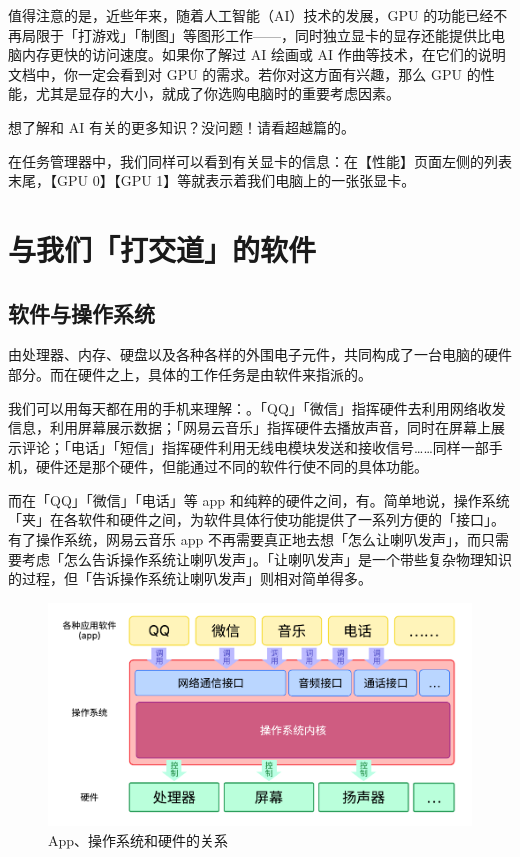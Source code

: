 值得注意的是，近些年来，随着人工智能（AI）技术的发展，GPU 的功能已经不再局限于「打游戏」「制图」等图形工作——，同时独立显卡的显存还能提供比电脑内存更快的访问速度。如果你了解过 AI 绘画或 AI 作曲等技术，在它们的说明文档中，你一定会看到对 GPU 的需求。若你对这方面有兴趣，那么 GPU 的性能，尤其是显存的大小，就成了你选购电脑时的重要考虑因素。

\begin{note}
  想了解和 AI 有关的更多知识？没问题！请看超越篇的。
\end{note}

在任务管理器中，我们同样可以看到有关显卡的信息：在【性能】页面左侧的列表末尾，【GPU 0】【GPU 1】等就表示着我们电脑上的一张张显卡。

\section{与我们「打交道」的软件}

\subsection{软件与操作系统}

由处理器、内存、硬盘以及各种各样的外围电子元件，共同构成了一台电脑的硬件部分。而在硬件之上，具体的工作任务是由软件来指派的。

我们可以用每天都在用的手机来理解：。「QQ」「微信」指挥硬件去利用网络收发信息，利用屏幕展示数据；「网易云音乐」指挥硬件去播放声音，同时在屏幕上展示评论；「电话」「短信」指挥硬件利用无线电模块发送和接收信号……同样一部手机，硬件还是那个硬件，但能通过不同的软件行使不同的具体功能。

而在「QQ」「微信」「电话」等 app 和纯粹的硬件之间，有。简单地说，操作系统「夹」在各软件和硬件之间，为软件具体行使功能提供了一系列方便的「接口」。有了操作系统，网易云音乐 app 不再需要真正地去想「怎么让喇叭发声」，而只需要考虑「怎么告诉操作系统让喇叭发声」。「让喇叭发声」是一个带些复杂物理知识的过程，但「告诉操作系统让喇叭发声」则相对简单得多。

\begin{figure}[htb!]
  \centering
  \includegraphics[width=.8\textwidth]{assets/basic/OS_structure.pdf}
  \caption{App、操作系统和硬件的关系}
  \label{fig:OS_structure}
\end{figure}


